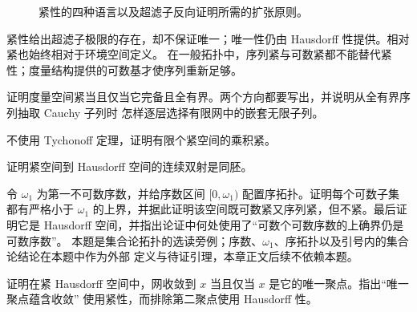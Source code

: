 \begin{figure}[htbp]
\centering
{}
\caption{紧性的四种语言以及超滤子反向证明所需的扩张原则。}
\label{fig:1-2-1-compactness-equivalences}
\end{figure}

紧性给出超滤子极限的存在，却不保证唯一；唯一性仍由 Hausdorff 性提供。相对紧也始终相对于环境空间定义。
在一般拓扑中，序列紧与可数紧都不能替代紧性；度量结构提供的可数基才使序列重新足够。

\begin{exercise}
证明度量空间紧当且仅当它完备且全有界。两个方向都要写出，并说明从全有界序列抽取 Cauchy 子列时
怎样逐层选择有限网中的嵌套无限子列。
\end{exercise}
\begin{exercise}
不使用 Tychonoff 定理，证明有限个紧空间的乘积紧。
\end{exercise}
\begin{exercise}
证明紧空间到 Hausdorff 空间的连续双射是同胚。
\end{exercise}
\begin{exercise}
令 \(\omega_1\) 为第一不可数序数，并给序数区间 \([0,\omega_1)\) 配置序拓扑。证明每个可数子集
都有严格小于 \(\omega_1\) 的上界，并据此证明该空间既可数紧又序列紧，但不紧。最后证明它是
Hausdorff 空间，并指出论证中何处使用了“可数个可数序数的上确界仍是可数序数”。
本题是集合论拓扑的选读旁例；序数、\(\omega_1\)、序拓扑以及引号内的集合论结论在本题中作为外部
定义与待证引理，本章正文后续不依赖本题。
\end{exercise}
\begin{exercise}
证明在紧 Hausdorff 空间中，网收敛到 \(x\) 当且仅当 \(x\) 是它的唯一聚点。指出“唯一聚点蕴含收敛”
使用紧性，而排除第二聚点使用 Hausdorff 性。
\end{exercise}

